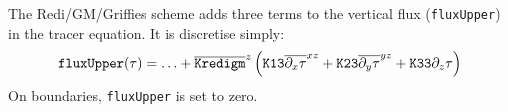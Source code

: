 The Redi/GM/Griffies scheme adds three terms to the vertical flux
({\tt fluxUpper}) in the tracer equation. It is discretise simply:
\begin{displaymath}
{\tt fluxUpper}(\tau) = \ldots + \overline{\tt Kredigm}^z 
\left( 
{\tt K13} \overline{\partial_x \tau}^{xz} +
{\tt K23} \overline{\partial_y \tau}^{yz} +
{\tt K33} \partial_z \tau
\right)
\end{displaymath}
On boundaries, {\tt fluxUpper} is set to zero.


